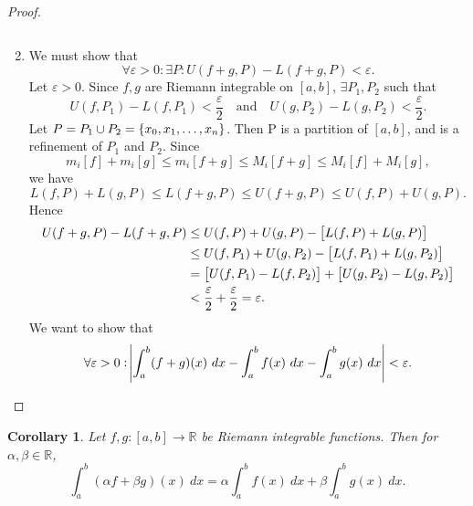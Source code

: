 \documentclass[12pt,openany]{book}
\newtheorem{corollary}{Corollary}[theorem]
\theoremstyle{definition}
\newcommand{\R}{\mathbb{R}}
\begin{document}
\begin{proof}
\begin{enumerate}[(1)]
\[			\]
			\item We must show that \[
			\forall\varepsilon>0:\exists P:U(f+g,P)-L(f+g,P)<\varepsilon.
			\] Let \(\varepsilon>0\). Since \(f,g\) are Riemann integrable on \([a,b]\), \(\exists P_1,P_2\) such that \[
			U(f,P_1)-L(f,P_1)<\frac{\varepsilon}{2}\quad\text{and}\quad U(g,P_2)-L(g,P_2)<\frac{\varepsilon}{2}.
			\] Let \(P=P_1\cup P_2=\set{x_0,x_1,\dots,x_n}\). Then P is a partition of \([a,b]\), and is a refinement of \(P_1\) and \(P_2\).
			Since \[
			m_i[f]+m_i[g]\leq m_i[f+g]\leq M_i[f+g]\leq M_i[f]+M_i[g],
			\] we have \[
			L(f,P)+L(g,P)\leq L(f+g,P)\leq U(f+g,P)\leq U(f,P)+U(g,P). 
			\] Hence \begin{align*}
				U(f+g,P)-L(f+g,P)&\leq U(f,P)+U(g,P)-\sbr{L(f,P)+L(g,P)}\\
				&\leq U(f,P_1)+U(g,P_2)-\sbr{L(f,P_1)+L(g,P_2)}\\
				&=\sbr{U(f,P_1)-L(f,P_2)}+\sbr{U(g,P_2)-L(g,P_2)}\\
				&<\frac{\varepsilon}{2}+\frac{\varepsilon}{2}=\varepsilon.
			\end{align*}
			We want to show that \[
			\forall\varepsilon>0:\abs{\int_a^b(f+g)(x)\ dx- \int_a^bf(x)\ dx- \int_a^b g(x)\ dx}<\varepsilon.
			\]
		\end{enumerate}
	\end{proof}
	\vspace{4pt}
	\begin{tcolorbox}[colframe=corcolor, title={\color{white}\bf }]
		\begin{corollary}
			Let \(f,g:[a,b]\to\R\) be Riemann integrable functions. Then for \(\alpha,\beta\in\R\), \[
			\int_a^b(\alpha f+\beta g)(x)\ dx = \alpha\int_a^b f(x)\ dx+\beta\int_a^b g(x)\ dx.
			\]
		\end{corollary}
	\end{tcolorbox}
	
\end{document}
